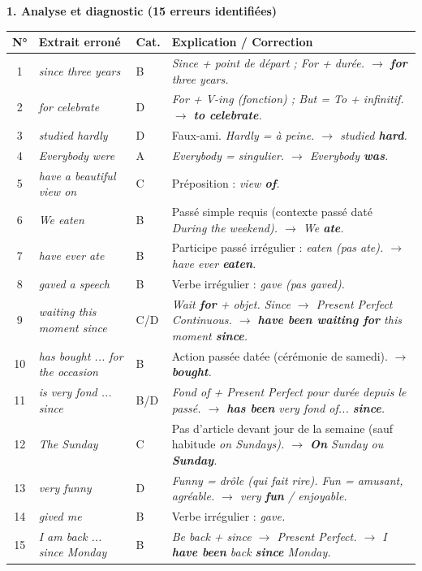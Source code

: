 \documentclass[11pt]{article}
\newcommand{\eng}[1]{\ifmmode\text{\textit{#1}}\else\begingroup\selectlanguage{english}\itshape #1\endgroup\fi}
\begin{document}
\begin{exoresolu}
\textbf{1. Analyse et diagnostic (15 erreurs identifiées)}

\begin{center}
\begin{tabularx}{\linewidth}{|c|l|l|X|}
\hline
\rowcolor{popblueL} \textbf{N°} & \textbf{Extrait erroné} & \textbf{Cat.} & \textbf{Explication / Correction} \\
\hline
1 & \eng{since three years} & B & \eng{Since} + point de départ ; \eng{For} + durée. $\to$ \eng{\textbf{for} three years}. \\
\hline
2 & \eng{for celebrate} & D & \eng{For} + V-ing (fonction) ; But = \eng{To} + infinitif. $\to$ \eng{\textbf{to celebrate}}. \\
\hline
3 & \eng{studied hardly} & D & Faux-ami. \eng{Hardly} = à peine. $\to$ \eng{studied \textbf{hard}}. \\
\hline
4 & \eng{Everybody were} & A & \eng{Everybody} = singulier. $\to$ \eng{Everybody \textbf{was}}. \\
\hline
5 & \eng{have a beautiful view on} & C & Préposition : \eng{view \textbf{of}}. \\
\hline
6 & \eng{We eaten} & B & Passé simple requis (contexte passé daté \eng{During the weekend}). $\to$ \eng{We \textbf{ate}}. \\
\hline
7 & \eng{have ever ate} & B & Participe passé irrégulier : \eng{eaten} (pas \eng{ate}). $\to$ \eng{have ever \textbf{eaten}}. \\
\hline
8 & \eng{gaved a speech} & B & Verbe irrégulier : \eng{gave} (pas \eng{gaved}). \\
\hline
9 & \eng{waiting this moment since} & C/D & \eng{Wait \textbf{for}} + objet. \eng{Since} $\to$ \eng{Present Perfect Continuous}. $\to$ \eng{\textbf{have been waiting for} this moment \textbf{since}}. \\
\hline
10 & \eng{has bought ... for the occasion} & B & Action passée datée (cérémonie de samedi). $\to$ \eng{\textbf{bought}}. \\
\hline
11 & \eng{is very fond ... since} & B/D & \eng{Fond of} + \eng{Present Perfect} pour durée depuis le passé. $\to$ \eng{\textbf{has been}} very fond of... \textbf{since}. \\
\hline
12 & \eng{The Sunday} & C & Pas d'article devant jour de la semaine (sauf habitude \eng{on Sundays}). $\to$ \eng{\textbf{On} Sunday} ou \eng{\emptyset \textbf{Sunday}}. \\
\hline
13 & \eng{very funny} & D & \eng{Funny} = drôle (qui fait rire). \eng{Fun} = amusant, agréable. $\to$ \eng{very \textbf{fun}} / \eng{enjoyable}. \\
\hline
14 & \eng{gived me} & B & Verbe irrégulier : \eng{gave}. \\
\hline
15 & \eng{I am back ... since Monday} & B & \eng{Be back} + \eng{since} $\to$ \eng{Present Perfect}. $\to$ \eng{I \textbf{have been} back \textbf{since} Monday}. \\
\hline
\end{tabularx}
\end{center}


\end{exoresolu}
\end{document}
